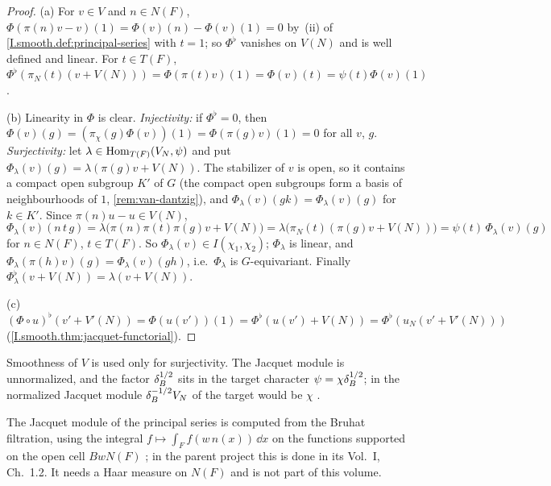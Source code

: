 \begin{theorem}
\end{theorem}
\begin{proof}
(a) For $v\in V$ and $n\in N(F)$, $\Phi(\pi(n)v-v)(1)=\Phi(v)(n)-\Phi(v)(1)=0$ by~(ii) of
\cref{I.smooth.def:principal-series} with $t=1$; so $\Phi^\flat$ vanishes on $V(N)$ and is well defined and linear. For
$t\in T(F)$, $\Phi^\flat(\pi_N(t)(v+V(N)))=\Phi(\pi(t)v)(1)=\Phi(v)(t)=\psi(t)\Phi(v)(1)$.

(b) Linearity in $\Phi$ is clear. \emph{Injectivity:} if $\Phi^\flat=0$, then
$\Phi(v)(g)=(\pi_\chi(g)\Phi(v))(1)=\Phi(\pi(g)v)(1)=0$ for all $v$, $g$. \emph{Surjectivity:} let
$\lambda\in\operatorname{Hom}_{T(F)}(V_N,\psi)$ and put $\Phi_\lambda(v)(g)=\lambda(\pi(g)v+V(N))$. The stabilizer of $v$ is open, so it
contains a compact open subgroup $K'$ of $G$ (the compact open subgroups form a basis of neighbourhoods of $1$,
\cref{rem:van-dantzig}), and $\Phi_\lambda(v)(gk)=\Phi_\lambda(v)(g)$ for $k\in K'$. Since
$\pi(n)u-u\in V(N)$,
\[
  \Phi_\lambda(v)(n\,t\,g)=\lambda\bigl(\pi(n)\pi(t)\pi(g)v+V(N)\bigr)=\lambda\bigl(\pi_N(t)(\pi(g)v+V(N))\bigr)=\psi(t)\,\Phi_\lambda(v)(g)
\]
for $n\in N(F)$, $t\in T(F)$. So $\Phi_\lambda(v)\in I(\chi_1,\chi_2)$; $\Phi_\lambda$ is linear, and
$\Phi_\lambda(\pi(h)v)(g)=\Phi_\lambda(v)(gh)$, i.e.\ $\Phi_\lambda$ is $G$-equivariant. Finally
$\Phi_\lambda^\flat(v+V(N))=\lambda(v+V(N))$.

(c) $(\Phi\circ u)^\flat(v'+V'(N))=\Phi(u(v'))(1)=\Phi^\flat(u(v')+V(N))=\Phi^\flat(u_N(v'+V'(N)))$
(\cref{I.smooth.thm:jacquet-functorial}).
\end{proof}

\noindent Smoothness of $V$ is used only for surjectivity. The Jacquet module is unnormalized, and the factor
$\delta_B^{1/2}$ sits in the target character $\psi=\chi\delta_B^{1/2}$; in the normalized Jacquet module
$\delta_B^{-1/2}V_N$ of \cite{BZ} the target would be $\chi$ \cite[Theorem~3.2.4, p.~34]{Cas-p}.

\noindent The Jacquet module of the principal series is computed from the Bruhat filtration, using the integral
$f\mapsto\int_Ff(w\,n(x))\,\dd x$ on the functions supported on the open cell $BwN(F)$ \cite[§§3, 6]{Cas-p}; in the parent project this
is done in its Vol.~I, Ch.~1.2. It needs a Haar measure on $N(F)$ and is not part of this volume.

